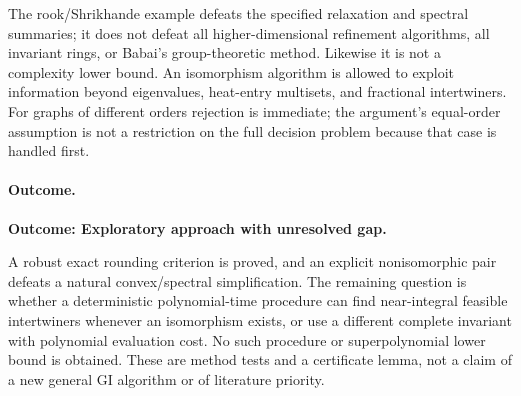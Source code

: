 \documentclass[11pt,a4paper]{article}
\numberwithin{equation}{section}
\begin{document}
The rook/Shrikhande example defeats the specified relaxation and spectral
summaries; it does not defeat all higher-dimensional refinement algorithms,
all invariant rings, or Babai's group-theoretic method. Likewise it is not
a complexity lower bound. An isomorphism algorithm is allowed to exploit
information beyond eigenvalues, heat-entry multisets, and fractional
intertwiners. For graphs of different orders rejection is immediate; the
argument's equal-order assumption is not a restriction on the full decision
problem because that case is handled first.

\paragraph{Outcome.}
\textbf{Outcome: Exploratory approach with unresolved gap.}

A robust exact rounding criterion is proved, and an explicit nonisomorphic
pair defeats a natural convex/spectral simplification. The remaining
question is whether a deterministic polynomial-time procedure can find
near-integral feasible intertwiners whenever an isomorphism exists, or
use a different complete invariant with polynomial evaluation cost.
No such procedure or superpolynomial lower bound is obtained. These are
method tests and a certificate lemma, not a claim of a new general GI
algorithm or of literature priority.
\end{document}
